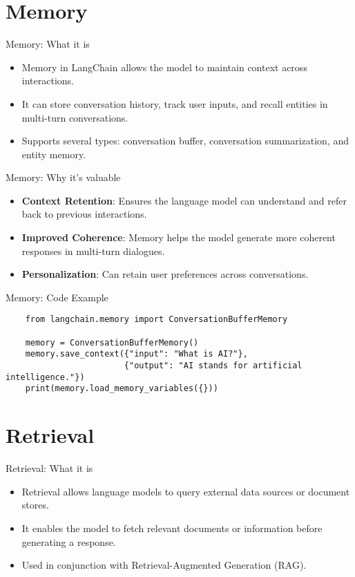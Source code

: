 \documentclass{beamer}
\begin{document}
\section{Memory}

\begin{frame}{Memory: What it is}
    \begin{itemize}
        \item Memory in LangChain allows the model to maintain context across interactions.
        \item It can store conversation history, track user inputs, and recall entities in multi-turn conversations.
        \item Supports several types: conversation buffer, conversation summarization, and entity memory.
    \end{itemize}
\end{frame}

\begin{frame}{Memory: Why it's valuable}
    \begin{itemize}
        \item \textbf{Context Retention}: Ensures the language model can understand and refer back to previous interactions.
        \item \textbf{Improved Coherence}: Memory helps the model generate more coherent responses in multi-turn dialogues.
        \item \textbf{Personalization}: Can retain user preferences across conversations.
    \end{itemize}
\end{frame}

\begin{frame}[fragile]{Memory: Code Example}
    \begin{verbatim}
    from langchain.memory import ConversationBufferMemory

    memory = ConversationBufferMemory()
    memory.save_context({"input": "What is AI?"},
                        {"output": "AI stands for artificial intelligence."})
    print(memory.load_memory_variables({}))
    \end{verbatim}
\end{frame}

\section{Retrieval}

\begin{frame}{Retrieval: What it is}
    \begin{itemize}
        \item Retrieval allows language models to query external data sources or document stores.
        \item It enables the model to fetch relevant documents or information before generating a response.
        \item Used in conjunction with Retrieval-Augmented Generation (RAG).
    \end{itemize}
\end{frame}
\end{document}
